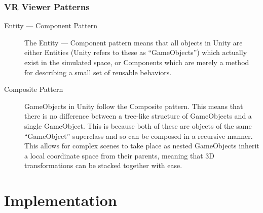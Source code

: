 \documentclass[12pt]{report}
\begin{document}
\subsubsection{VR Viewer Patterns}
\begin{description}
    \item [Entity --- Component Pattern] The Entity --- Component pattern means
        that all objects in Unity are either Entities (Unity refers to these as
        ``GameObjects'') which actually exist in the simulated space, or
        Components which are merely a method for describing a small set of
        reusable behaviors.

    \item [Composite Pattern] GameObjects in Unity follow the Composite
        pattern. This means that there is no difference between a tree-like
        structure of GameObjects and a single GameObject. This is because both
        of these are objects of the same ``GameObject'' superclass and so can
        be composed in a recursive manner. This allows for complex scenes to
        take place as nested GameObjects inherit a local coordinate space from
        their parents, meaning that 3D transformations can be stacked together
        with ease.

\end{description}

\section{Implementation}
\end{document}
